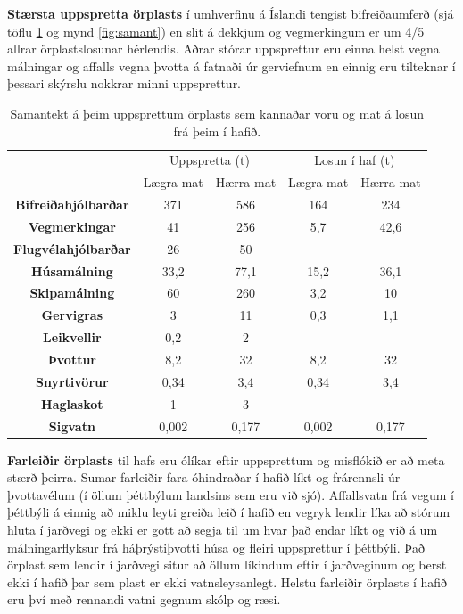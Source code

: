 \documentclass[icelandic,]{book}
\begin{document}
\textbf{Stærsta uppspretta örplasts} í umhverfinu á Íslandi tengist bifreiðaumferð (sjá töflu \ref{tab:samantekt} og mynd \ref{fig:samant}) en slit á dekkjum og vegmerkingum er um 4/5 allrar örplastslosunar hérlendis. Aðrar stórar uppsprettur eru einna helst vegna málningar og affalls vegna þvotta á fatnaði úr gerviefnum en einnig eru tilteknar í þessari skýrslu nokkrar minni uppsprettur.

\begin{table}[H]

\caption{\label{tab:samantekt}Samantekt á þeim uppsprettum örplasts sem kannaðar voru og mat á losun frá þeim í hafið.}
\centering
\begin{tabular}{>{\bfseries}ccc|cc}
\toprule
\multicolumn{1}{c}{ } & \multicolumn{2}{c}{Uppspretta (t)} & \multicolumn{2}{c}{Losun í haf (t)} \\
\cmidrule(l{3pt}r{3pt}){2-3} \cmidrule(l{3pt}r{3pt}){4-5}
 & Lægra mat & Hærra mat & Lægra mat & Hærra mat\\
\midrule
\rowcolor{gray!6} Bifreiðahjólbarðar & 371 & 586 & 164 & 234\\
Vegmerkingar & 41 & 256 & 5,7 & 42,6\\
\rowcolor{gray!6} Flugvélahjólbarðar & 26 & 50 &  & \\
Húsamálning & 33,2 & 77,1 & 15,2 & 36,1\\
\rowcolor{gray!6} Skipamálning & 60 & 260 & 3,2 & 10\\
Gervigras & 3 & 11 & 0,3 & 1,1\\
\rowcolor{gray!6} Leikvellir & 0,2 & 2 &  & \\
Þvottur & 8,2 & 32 & 8,2 & 32\\
\rowcolor{gray!6} Snyrtivörur & 0,34 & 3,4 & 0,34 & 3,4\\
Haglaskot & 1 & 3 &  & \\
\rowcolor{gray!6} Sigvatn & 0,002 & 0,177 & 0,002 & 0,177\\
\bottomrule
\end{tabular}
\end{table}



\textbf{Farleiðir örplasts} til hafs eru ólíkar eftir uppsprettum og misflókið er að meta stærð þeirra. Sumar farleiðir fara óhindraðar í hafið líkt og frárennsli úr þvottavélum (í öllum þéttbýlum landsins sem eru við sjó). Affallsvatn frá vegum í þéttbýli á einnig að miklu leyti greiða leið í hafið en vegryk lendir líka að stórum hluta í jarðvegi og ekki er gott að segja til um hvar það endar líkt og við á um málningarflyksur frá háþrýstiþvotti húsa og fleiri uppsprettur í þéttbýli. Það örplast sem lendir í jarðvegi situr að öllum líkindum eftir í jarðveginum og berst ekki í hafið þar sem plast er ekki vatnsleysanlegt. Helstu farleiðir örplasts í hafið eru því með rennandi vatni gegnum skólp og ræsi.
\end{document}
